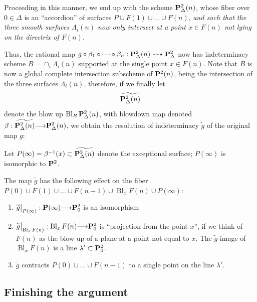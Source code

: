 \documentclass[12pt,reqno]{amsart}
\DeclareMathOperator{\Bl}{Bl}
\renewcommand{\to}{{\longrightarrow}}
\numberwithin{equation}{section}
\newcommand{\td}{\widetilde}
\begin{document}
Proceeding in this manner, we end up with the scheme
$\P^{2}_{\Delta}(n)$, whose fiber over $0 \in \Delta$ is an
``accordion'' of surfaces $P \cup F(1) \cup \dots \cup F(n)$, {\sl and
  such that the three smooth surfaces $\Lambda_{i}(n)$ now only
  intersect at a point $x \in F(n)$ not lying on the directrix of
  $F(n)$.}

Thus, the rational map
$g \circ \beta_{1} \circ \dots \circ \beta_{n}: \P^{2}_{\Delta}(n)
\dashrightarrow \P^{2}_{\Delta}$ now has indeterminacy scheme
$B = \cap_{i} \Lambda_{i}(n)$ supported at the single point
$x \in F(n)$.  Note that $B$ is now a global complete intersection
subscheme of $\P^{2}(n)$, being the intersection of the three surfaces
$\Lambda_{i}(n)$, therefore, if we finally let
\[\td{\P^{2}_{\Delta}(n)}\]
denote the blow up $\Bl_{B}\P^{2}_{\Delta}(n)$, with blowdown map
denoted $\beta: \td{\P^{2}_{\Delta}(n)} \to \P^{2}_{\Delta}(n)$, we
obtain the resolution of indeterminacy $\td{g}$ of the original map
$g$:
\begin{center}
\end{center}
Let $P(\infty) = \beta^{-1}(x) \subset \td{\P^{2}_{\Delta}(n)}$ denote
the exceptional surface; $P(\infty)$ is isomorphic to $\P^{2}$.

The map $\td{g}$ has the following effect on the fiber
$P(0) \cup F(1) \cup \dots \cup F(n-1) \cup \Bl_{x}F(n) \cup
P(\infty)$:
\begin{enumerate}
\item $\td{g}\big|_{P(\infty)}: \P(\infty) \to \P^{2}_{0}$ is an
  isomorphism \\
\item $\td{g}\big|_{\Bl_{x}F(n)}: \Bl_{x}F(n) \to \P^{2}_{0}$ is
  ``projection from the point $x$'', if we think of $F(n)$ as the blow
  up of a plane at a point not equal to $x$.  The $\td{g}$-image of
  $\Bl_{x}F(n)$ is a line $\lambda' \subset \P^{2}_{0}$.\\
\item $\td{g}$ contracts $P(0) \cup \dots \cup F(n-1)$ to a single
  point on the line $\lambda'$.
\end{enumerate}

\subsection{Finishing the argument}
\label{sec:finishargument}
\end{document}
